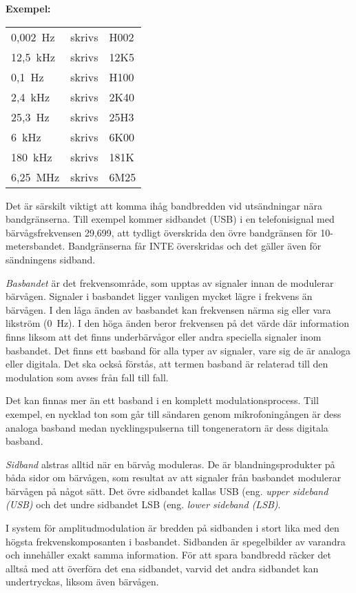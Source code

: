\textbf{Exempel:}

\begin{tabular}{lll}
	0,002~Hz & skrivs & H002\\
	12,5~kHz & skrivs & 12K5\\
	0,1~Hz & skrivs & H100\\
	2,4~kHz & skrivs & 2K40\\
	25,3~Hz & skrivs & 25H3\\
	6~kHz & skrivs & 6K00\\
	180~kHz & skrivs & 181K\\
	6,25~MHz & skrivs & 6M25\\
\end{tabular}

Det är särskilt viktigt att komma ihåg bandbredden vid utsändningar nära
bandgränserna.
Till exempel kommer sidbandet (USB) i en telefonisignal med bärvågsfrekvensen 29,699,
att tydligt överskrida den övre bandgränsen för 10-metersbandet.
Bandgränserna får INTE överskridas och det gäller även för sändningens sidband.

\emph{Basbandet} är det frekvensområde, som upptas av signaler innan de
modulerar bärvågen.
Signaler i basbandet ligger vanligen mycket lägre i frekvens än bärvågen.
I den låga änden av basbandet kan frekvensen närma sig eller vara likström
(0~Hz).
I den höga änden beror frekvensen på det värde där information finns liksom att
det finns underbärvågor eller andra speciella signaler inom basbandet.
Det finns ett basband för alla typer av signaler, vare sig de är analoga eller
digitala.
Det ska också förstås, att termen basband är relaterad till den modulation som
avses från fall till fall.

Det kan finnas mer än ett basband i en komplett modulationsprocess.
Till exempel, en nycklad ton som går till sändaren genom mikrofoningången är
dess analoga basband medan nycklingspulserna till tongeneratorn är dess digitala
basband.

\emph{Sidband} alstras alltid när en bärvåg moduleras.
De är blandningsprodukter på båda sidor om bärvågen, som resultat av att
signaler från basbandet modulerar bärvågen på något sätt.
Det övre sidbandet kallas USB (eng. \emph{upper sideband (USB)}
och det undre sidbandet LSB (eng. \emph{lower sideband (LSB)}.

I system för amplitudmodulation är bredden på sidbanden i stort lika med den
högsta frekvenskomposanten i basbandet.
Sidbanden är spegelbilder av varandra och innehåller exakt samma information.
För att spara bandbredd räcker det alltså med att överföra det ena sidbandet,
varvid det andra sidbandet kan undertryckas, liksom även bärvågen.

